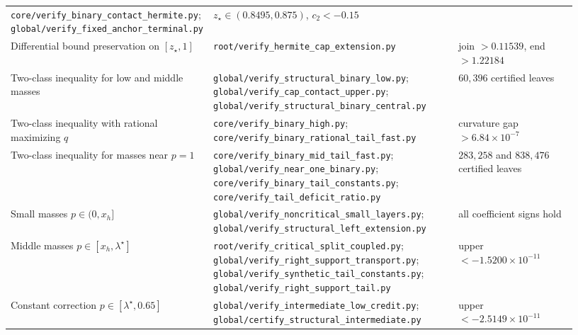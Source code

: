 \documentclass[11pt]{article}
\numberwithin{equation}{section}
\theoremstyle{plain}
\theoremstyle{definition}
\newcommand{\1}{\mathbf{1}}
\begin{document}
\begin{table}[!t]
\begin{tabular}{@{}
  >{\raggedright\arraybackslash}p{0.25\linewidth}
  >{\raggedright\arraybackslash}p{0.45\linewidth}
  >{\raggedright\arraybackslash}p{0.23\linewidth}@{}}
  \texttt{core/verify\_binary\_contact\_hermite.py};\newline
  \texttt{global/verify\_fixed\_anchor\_terminal.py} &
  $z_\star \in (0.8495, 0.875)$, $c_2 < -0.15$ \\[3pt]
Differential bound preservation on $[z_\star, 1]$ &
  \texttt{root/verify\_hermite\_cap\_extension.py} &
  join $> 0.11539$, end $> 1.22184$ \\[3pt]
Two-class inequality for low and middle masses &
  \texttt{global/verify\_structural\_binary\_low.py};\newline
  \texttt{global/verify\_cap\_contact\_upper.py};\newline
  \texttt{global/verify\_structural\_binary\_central.py} &
  $60{,}396$ certified leaves \\[3pt]
Two-class inequality with rational maximizing $q$ &
  \texttt{core/verify\_binary\_high.py};\newline
  \texttt{core/verify\_binary\_rational\_tail\_fast.py} &
  curvature gap $> 6.84 \times 10^{-7}$ \\[3pt]
Two-class inequality for masses near $p = 1$ &
  \texttt{core/verify\_binary\_mid\_tail\_fast.py};\newline
  \texttt{global/verify\_near\_one\_binary.py};\newline
  \texttt{core/verify\_binary\_tail\_constants.py};\newline
  \texttt{core/verify\_tail\_deficit\_ratio.py} &
  $283{,}258$ and $838{,}476$ certified leaves \\[3pt]
Small masses $p \in (0, x_h]$ &
  \texttt{global/verify\_noncritical\_small\_layers.py};\newline
  \texttt{global/verify\_structural\_left\_extension.py} &
  all coefficient signs hold \\[3pt]
Middle masses $p \in [x_h, \lambda^\star]$ &
  \texttt{root/verify\_critical\_split\_coupled.py};\newline
  \texttt{global/verify\_right\_support\_transport.py};\newline
  \texttt{global/verify\_synthetic\_tail\_constants.py};\newline
  \texttt{global/verify\_right\_support\_tail.py} &
  upper $< -1.5200 \times 10^{-11}$ \\[3pt]
Constant correction $p \in [\lambda^\star, 0.65]$ &
  \texttt{global/verify\_intermediate\_low\_credit.py};\newline
  \texttt{global/certify\_structural\_intermediate.py} &
  upper $< -2.5149 \times 10^{-11}$ \\[3pt]

\end{tabular}
\end{table}
\end{document}
